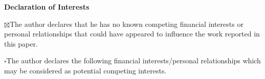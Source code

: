 \documentclass[11pt]{article}
\begin{document}
\begin{center}
    {\Large\bfseries Declaration of Interests}
\end{center}

\vspace{1em}

\noindent
$\boxtimes$\quad The author declares that he has no known competing financial interests or personal relationships that could have appeared to influence the work reported in this paper.

\vspace{1em}

\noindent
$\square$\quad The author declares the following financial interests/personal relationships which may be considered as potential competing interests.
\end{document}
